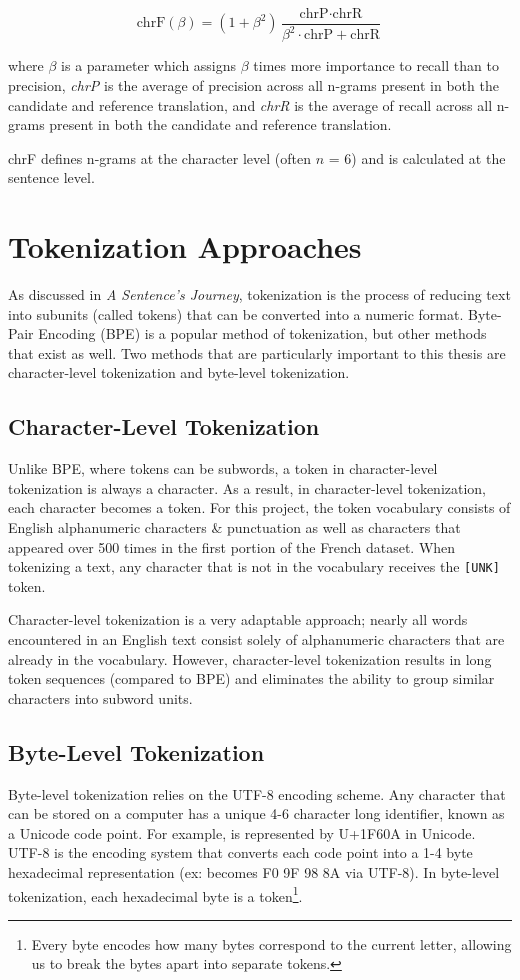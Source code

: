 \[
\text{chrF}(\beta) = (1 + \beta^2) \frac{\text{chrP} \cdot \text{chrR}}{\beta^2 \cdot \text{chrP} + \text{chrR}}
\]
\begin{center}
where $\beta$ is a parameter which assigns $\beta$ times more importance to recall than to precision, \textit{chrP} is the average of precision across all n-grams present in both the candidate and reference translation, and \textit{chrR} is the average of recall across all n-grams present in both the candidate and reference translation.
\end{center}

chrF defines n-grams at the character level (often $n$ = 6) and is calculated at the sentence level.

\section{Tokenization Approaches}
As discussed in \textit{A Sentence's Journey}, tokenization is the process of reducing text into subunits (called tokens) that can be converted into a numeric format. Byte-Pair Encoding (BPE) is a popular method of tokenization, but other methods that exist as well. Two methods that are particularly important to this thesis are character-level tokenization and byte-level tokenization. 

\subsection{Character-Level Tokenization}
Unlike BPE, where tokens can be subwords, a token in character-level tokenization is always a character. As a result, in character-level tokenization, each character becomes a token. For this project, the token vocabulary consists of English alphanumeric characters \& punctuation as well as characters that appeared over 500 times in the first portion of the French dataset. When tokenizing a text, any character that is not in the vocabulary receives the \texttt{[UNK]} token.

Character-level tokenization is a very adaptable approach; nearly all words encountered in an English text consist solely of alphanumeric characters that are already in the vocabulary. However, character-level tokenization results in long token sequences (compared to BPE) and eliminates the ability to group similar characters into subword units.

\subsection{Byte-Level Tokenization}
Byte-level tokenization relies on the UTF-8 encoding scheme. Any character that can be stored on a computer has a unique 4-6 character long identifier, known as a Unicode code point. For example,  is represented by U+1F60A in Unicode. UTF-8 is the encoding system that converts each code point into a 1-4 byte hexadecimal representation (ex:  becomes F0 9F 98 8A via UTF-8). In byte-level tokenization, each hexadecimal byte is a token\footnote{Every byte encodes how many bytes correspond to the current letter, allowing us to break the bytes apart into separate tokens.}.

